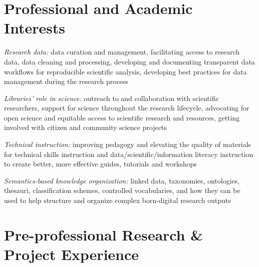 \documentclass[12pt,letterpaper]{report}
\newcommand{\listitemspace}{0.25em}
\renewenvironment{itemize}
{\begin{list}{}{\setlength{\leftmargin}{0em}
            \setlength{\parskip}{0em}
            \setlength{\itemsep}{\listitemspace}
            \setlength{\parsep}{\listitemspace}}}
{\end{list}}
\begin{document}
\section*{Professional and Academic Interests}

\begin{itemize}

	\item \textit{Research data:} data curation and management, facilitating access to research data, data cleaning and processing, developing and documenting transparent data workflows for reproducible scientific analysis, developing best practices for data management during the research process

	\item \textit{Libraries' role in science:} outreach to and collaboration with scientific researchers, support for science throughout the research lifecycle, advocating for open science and equitable access to scientific research and resources, getting involved with citizen and community science projects

	\item \textit{Technical instruction:} improving pedagogy and elevating the quality of materials for technical skills instruction and data/scientific/information literacy instruction to create better, more effective guides, tutorials and workshops

	\item \textit{Semantics-based knowledge organization:} linked data, taxonomies, ontologies, thesauri, classification schemes, controlled vocabularies, and how they can be used to help structure and organize complex born-digital research outputs

\end{itemize}



\section*{Pre-professional Research \& Project Experience}
\end{document}
